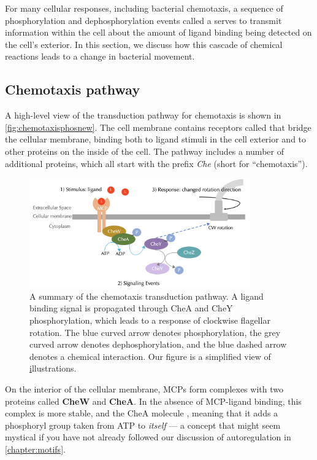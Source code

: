 For many cellular responses, including bacterial chemotaxis, a sequence of phosphorylation and dephosphorylation events called a  serves to transmit information within the cell about the amount of ligand binding being detected on the cell's exterior. In this section, we discuss how this cascade of chemical reactions leads to a change in bacterial movement.

\FloatBarrier
{}
\subsection{Chemotaxis pathway}

A high-level view of the transduction pathway for chemotaxis is shown in \autoref{fig:chemotaxisphosnew}. The cell membrane contains receptors called  that bridge the cellular membrane, binding both to ligand stimuli in the cell exterior and to other proteins on the inside of the cell. The pathway includes a number of additional proteins, which all start with the prefix \textit{Che} (short for ``chemotaxis'').

\begin{figure}[h]
\centering
\mySfFamily
\includegraphics[width = 0.85\textwidth]{../images/chemotaxisphosnew.png}
\caption{A summary of the chemotaxis transduction pathway. A ligand binding signal is propagated through CheA and CheY phosphorylation, which leads to a response of clockwise flagellar rotation. The blue curved arrow denotes phosphorylation, the grey curved arrow denotes dephosphorylation, and the blue dashed arrow denotes a chemical interaction. Our figure is a simplified view of \href{http://chemotaxis.biology.utah.edu/Parkinson_Lab/projects/ecolichemotaxis/ecolichemotaxis.html} illustrations.}
\label{fig:chemotaxisphosnew}
\end{figure}


On the interior of the cellular membrane, MCPs form complexes with two proteins called \textbf{CheW} and \textbf{CheA}. In the absence of MCP-ligand binding, this complex is more stable, and the CheA molecule , meaning that it adds a phosphoryl group taken from ATP to \textit{itself} --- a concept that might seem mystical if you have not already followed our discussion of autoregulation in \autoref{chapter:motifs}.

